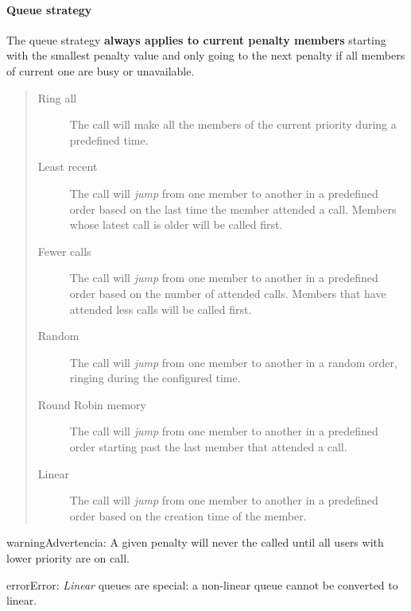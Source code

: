 \documentclass[letterpaper,10pt,spanish]{sphinxmanual}
\begin{document}
\paragraph{Queue strategy}
\label{administration_portal/client/vpbx/routing_endpoints/queues:queue-strategy}
The queue strategy \textbf{always applies to current penalty members} starting with
the smallest penalty value and only going to the next penalty if all members of
current one are busy or unavailable.
\begin{quote}
\begin{description}
\item[{Ring all}] \leavevmode
The call will make all the members of the current priority during a
predefined time.

\item[{Least recent}] \leavevmode
The call will \emph{jump} from one member to another in a predefined order
based on the last time the member attended a call. Members whose latest
call is older will be called first.

\item[{Fewer calls}] \leavevmode
The call will \emph{jump} from one member to another in a predefined order
based on the number of attended calls. Members that have attended less
calls will be called first.

\item[{Random}] \leavevmode
The call will \emph{jump} from one member to another in a random order,
ringing during the configured time.

\item[{Round Robin memory}] \leavevmode
The call will \emph{jump} from one member to another in a predefined order
starting past the last member that attended a call.

\item[{Linear}] \leavevmode
The call will \emph{jump} from one member to another in a predefined order
based on the creation time of the member.

\end{description}
\end{quote}

\begin{notice}{warning}{Advertencia:}
A given penalty will never the called until all users with lower priority are on call.
\end{notice}

\begin{notice}{error}{Error:}
\emph{Linear} queues are special: a non-linear queue cannot be converted to linear.
\end{notice}
\label{administration_portal/client/vpbx/routing_endpoints/conditional_routes:conditional-routes}
\end{document}
